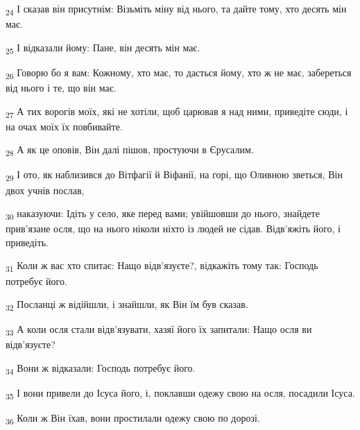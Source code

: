 \begin{tcolorbox}
\textsubscript{24} І сказав він присутнім: Візьміть міну від нього, та дайте тому, хто десять мін має.
\end{tcolorbox}
\begin{tcolorbox}
\textsubscript{25} І відказали йому: Пане, він десять мін має.
\end{tcolorbox}
\begin{tcolorbox}
\textsubscript{26} Говорю бо я вам: Кожному, хто має, то дасться йому, хто ж не має, забереться від нього і те, що він має.
\end{tcolorbox}
\begin{tcolorbox}
\textsubscript{27} А тих ворогів моїх, які не хотіли, щоб царював я над ними, приведіте сюди, і на очах моїх їх повбивайте.
\end{tcolorbox}
\begin{tcolorbox}
\textsubscript{28} А як це оповів, Він далі пішов, простуючи в Єрусалим.
\end{tcolorbox}
\begin{tcolorbox}
\textsubscript{29} І ото, як наблизився до Вітфагії й Віфанії, на горі, що Оливною зветься, Він двох учнів послав,
\end{tcolorbox}
\begin{tcolorbox}
\textsubscript{30} наказуючи: Ідіть у село, яке перед вами; увійшовши до нього, знайдете прив'язане осля, що на нього ніколи ніхто із людей не сідав. Відв'яжіть його, і приведіть.
\end{tcolorbox}
\begin{tcolorbox}
\textsubscript{31} Коли ж вас хто спитає: Нащо відв'язуєте?, відкажіть тому так: Господь потребує його.
\end{tcolorbox}
\begin{tcolorbox}
\textsubscript{32} Посланці ж відійшли, і знайшли, як Він їм був сказав.
\end{tcolorbox}
\begin{tcolorbox}
\textsubscript{33} А коли осля стали відв'язувати, хазяї його їх запитали: Нащо осля ви відв'язуєте?
\end{tcolorbox}
\begin{tcolorbox}
\textsubscript{34} Вони ж відказали: Господь потребує його.
\end{tcolorbox}
\begin{tcolorbox}
\textsubscript{35} І вони привели до Ісуса його, і, поклавши одежу свою на осля, посадили Ісуса.
\end{tcolorbox}
\begin{tcolorbox}
\textsubscript{36} Коли ж Він їхав, вони простилали одежу свою по дорозі.
\end{tcolorbox}
